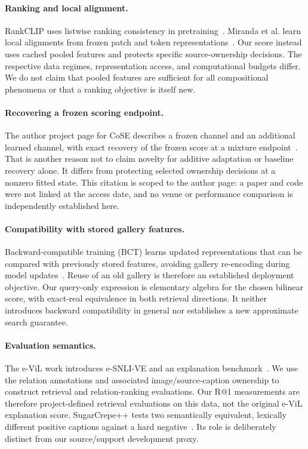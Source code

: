 \documentclass[11pt]{article}
\begin{document}
\paragraph{Ranking and local alignment.}
RankCLIP uses listwise ranking consistency in pretraining~\cite{rankclip}.
Miranda et al. learn local alignments from frozen patch and token
representations~\cite{inference}. Our score instead uses cached pooled
features and protects specific source-ownership decisions. The respective
data regimes, representation access, and computational budgets differ.
We do not claim that pooled features are sufficient for all compositional
phenomena or that a ranking objective is itself new.

\paragraph{Recovering a frozen scoring endpoint.}
The author project page for CoSE describes a frozen channel and an
additional learned channel, with exact recovery of the frozen score at a
mixture endpoint~\cite{cose}. That is another reason not to claim novelty
for additive adaptation or baseline recovery alone. It differs from
protecting selected ownership decisions at a nonzero fitted state. This
citation is scoped to the author page: a paper and code were not linked at
the access date, and no venue or performance comparison is independently
established here.

\paragraph{Compatibility with stored gallery features.}
Backward-compatible training (BCT) learns updated representations that
can be compared with previously stored features, avoiding gallery
re-encoding during model updates~\cite{bct}. Reuse of an old gallery is
therefore an established deployment objective. Our query-only expression
is elementary algebra for the chosen bilinear score, with exact-real
equivalence in both retrieval directions. It neither introduces
backward compatibility in general nor establishes a new approximate
search guarantee.

\paragraph{Evaluation semantics.}
The e-ViL work introduces e-SNLI-VE and an explanation benchmark~\cite{evil}.
We use the relation annotations and associated image/source-caption
ownership to construct retrieval and relation-ranking evaluations.
Our R@1 measurements are therefore project-defined retrieval evaluations
on this data, not the original e-ViL explanation score. SugarCrepe++ tests
two semantically equivalent, lexically different positive captions against
a hard negative~\cite{sugarcrepepp}. Its role is deliberately distinct from
our source/support development proxy.
\end{document}
